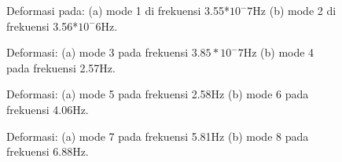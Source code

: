 \begin{figure}[H]
	\begin{subfigure}{0.49\textwidth}
		\centering
		\caption{}
		\label{fig:mode1}
	\end{subfigure}
	\centering
	\begin{subfigure}{0.49\textwidth}
		\centering
		\caption{}
		\label{fig:mode2}
	\end{subfigure}
	\caption{Deformasi pada: (a) mode 1 di frekuensi 3.55*$10^-7$Hz (b) mode 2 di frekuensi 3.56*$10^-6$Hz.}
\end{figure}

\begin{figure}[H]
	\begin{subfigure}{0.49\textwidth}
		\centering
		\caption{}
		\label{fig:mode3}
	\end{subfigure}
	\centering
	\begin{subfigure}{0.49\textwidth}
		\centering
		\caption{}
		\label{fig:mode4}
	\end{subfigure}
	\caption{Deformasi: (a) mode 3 pada frekuensi $3.85*10^-7$Hz (b) mode 4 pada frekuensi 2.57Hz.}
\end{figure}

\begin{figure}[H]
	\begin{subfigure}{0.49\textwidth}
		\centering
		\caption{}
		\label{fig:mode5}
	\end{subfigure}
	\centering
	\begin{subfigure}{0.49\textwidth}
		\centering
		\caption{}
		\label{fig:mode6}
	\end{subfigure}
	\caption{Deformasi: (a) mode 5 pada frekuensi 2.58Hz (b) mode 6 pada frekuensi 4.06Hz.}
\end{figure}

\begin{figure}[H]
	\begin{subfigure}{0.49\textwidth}
		\centering
		\caption{}
		\label{fig:mode7}
	\end{subfigure}
	\centering
	\begin{subfigure}{0.49\textwidth}
		\centering
		\caption{}
		\label{fig:mode8}
	\end{subfigure}
	\caption{Deformasi: (a) mode 7 pada frekuensi 5.81Hz (b) mode 8 pada frekuensi 6.88Hz.}
\end{figure}


